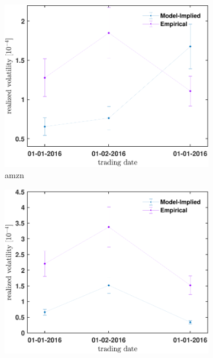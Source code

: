 \documentclass[11pt, a4paper]{thesis}  %
\begin{document}
\begin{figure}[H]
	
	\begin{subfigure}[b]{0.3\textwidth}
        \centering
        \includegraphics[width=\textwidth]{./RealizedVolatility/AMZN/realized_volatility_predicted_vs_actual.pdf}
        \caption{\ac{amzn}}
        \label{figure:results:realized_volatility_vs_trading_date:amzn}
    \end{subfigure}
    \hfill
	\begin{subfigure}[b]{0.3\textwidth}
        \centering
        \includegraphics[width=\textwidth]{./RealizedVolatility/NFLX/realized_volatility_predicted_vs_actual.pdf}

\end{subfigure}
\end{figure}
\end{document}
